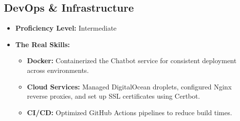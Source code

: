 \subsection{DevOps \& Infrastructure}
\begin{itemize}
    \item \textbf{Proficiency Level:} Intermediate
    \item \textbf{The Real Skills:}
    \begin{itemize}
        \item \textbf{Docker:} Containerized the Chatbot service for consistent deployment across environments.
        \item \textbf{Cloud Services:} Managed DigitalOcean droplets, configured Nginx reverse proxies, and set up SSL certificates using Certbot.
        \item \textbf{CI/CD:} Optimized GitHub Actions pipelines to reduce build times.
    \end{itemize}
\end{itemize}

